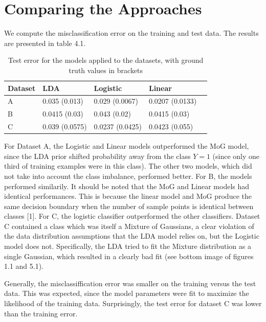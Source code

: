 \documentclass[paper=a4, fontsize=11pt]{scrartcl} %
\numberwithin{equation}{section} %
\numberwithin{figure}{section} %
\numberwithin{table}{section} %
\begin{document}
\newpage

\section{Comparing the Approaches}
We compute the misclassification error on the training and test data.
The results are presented in table 4.1.

	\begin{table}
		\caption {Test error for the models applied to the datasets, with ground truth values in brackets} \label{tab:title} 
		\begin{center}		
			\begin{tabular}{*5l}   
				\toprule
				Dataset &  LDA & Logistic & Linear
				\\\midrule
				A & 0.035 (0.013) & 0.029 (0.0067) & 0.0207 (0.0133) \\ 
				B & 0.0415 (0.03) & 0.043 (0.02) & 0.0415 (0.03) \\
				C & 0.039 (0.0575) & 0.0237 (0.0425) & 0.0423 (0.055) \\\bottomrule
				\hline
			\end{tabular}
		\end{center}
	\end{table}

For Dataset A, the Logistic and Linear models outperformed the MoG model, since the LDA prior shifted probability away from the class \(Y=1\) (since only one third of training examples were in this class). The other two models, which did not take into account the class imbalance, performed better. For B, the models performed similarily. It should be noted that the MoG and Linear models had identical performances. This is because the linear model and MoG produce the same decision boundary when the number of sample points is identical between classes [1]. For C, the logistic classifier  outperformed the other classifiers. Dataset C contained a class which was itself a Mixture of Gaussians, a clear violation of the data distribution assumptions that the LDA model relies on, but the Logistic model does not. Specifically, the LDA tried to fit the Mixture distribution as a single Gaussian, which resulted in a clearly bad fit (see bottom image of figures 1.1 and 5.1).

Generally, the misclassiffication error was smaller on the training versus the test data. This was expected, since the model parameters were fit to maximize the likelihood of the training data. Surprisingly, the test error for dataset C was lower than the training error.
\end{document}
